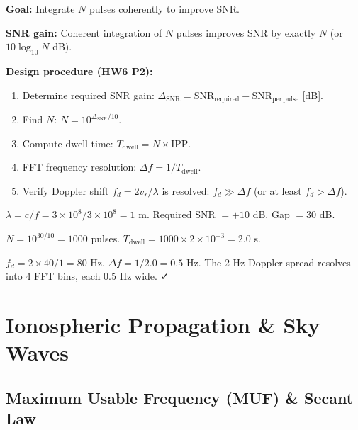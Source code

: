 \documentclass[10pt,letterpaper]{article}
\begin{document}
\begin{tcolorbox}[formulabox, title={Coherent FFT Processing Scheme}]
\textbf{Goal:} Integrate $N$ pulses coherently to improve SNR.

\textbf{SNR gain:} Coherent integration of $N$ pulses improves SNR by exactly $N$ (or $10\log_{10}N$ dB).

\textbf{Design procedure (HW6 P2):}
\begin{enumerate}[noitemsep]
  \item Determine required SNR gain: $\Delta_\mathrm{SNR} = \mathrm{SNR}_\mathrm{required} - \mathrm{SNR}_\mathrm{per\,pulse}$ [dB].
  \item Find $N$: $N = 10^{\Delta_\mathrm{SNR}/10}$.
  \item Compute dwell time: $T_\mathrm{dwell} = N\times\mathrm{IPP}$.
  \item FFT frequency resolution: $\Delta f = 1/T_\mathrm{dwell}$.
  \item Verify Doppler shift $f_d = 2v_r/\lambda$ is resolved: $f_d \gg \Delta f$ (or at least $f_d > \Delta f$).
\end{enumerate}
\end{tcolorbox}

\begin{tcolorbox}[examplebox, title={HW6 P2: 300 MHz Radar, $-20$ dB SNR per Pulse, 40 m/s Target}]
$\lambda = c/f = 3\times10^8/3\times10^8 = 1$ m. Required SNR $= +10$ dB. Gap $= 30$ dB.

$N = 10^{30/10} = 1000$ pulses. $T_\mathrm{dwell} = 1000\times2\times10^{-3} = 2.0$ s.

$f_d = 2\times40/1 = 80$ Hz. $\Delta f = 1/2.0 = 0.5$ Hz. The 2 Hz Doppler spread resolves into 4 FFT bins, each 0.5 Hz wide. ✓
\end{tcolorbox}

\section{Ionospheric Propagation \& Sky Waves}

\subsection{Maximum Usable Frequency (MUF) \& Secant Law}
\end{document}
